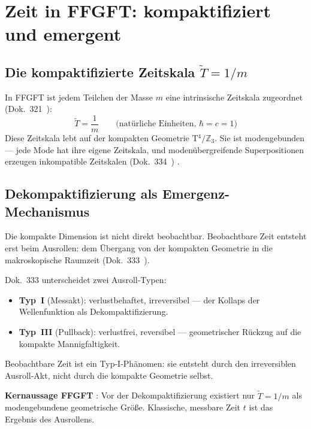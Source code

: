 \section{Zeit in FFGFT: kompaktifiziert und emergent}

\subsection{Die kompaktifizierte Zeitskala $\tilde{T} = 1/m$}

In FFGFT ist jedem Teilchen der Masse $m$ eine intrinsische
Zeitskala zugeordnet (Dok.~321~\cite{Pascher321}):
\begin{equation}
  \tilde{T} = \frac{1}{m}
  \qquad \text{(natürliche Einheiten, $\hbar = c = 1$)}
\end{equation}
Diese Zeitskala lebt auf der kompakten Geometrie T$^4/\mathbb{Z}_3$.
Sie ist modengebunden --- jede Mode hat ihre eigene Zeitskala,
und modenübergreifende Superpositionen erzeugen inkompatible
Zeitskalen (Dok.~334~\cite{Pascher334}) \BM.

\subsection{Dekompaktifizierung als Emergenz-Mechanismus}

Die kompakte Dimension ist nicht direkt beobachtbar.
Beobachtbare Zeit entsteht erst beim Ausrollen:
dem Übergang von der kompakten Geometrie in die makroskopische
Raumzeit (Dok.~333~\cite{Pascher333}).

Dok.~333 unterscheidet zwei Ausroll-Typen:
\begin{itemize}
  \item \textbf{Typ~I} (Messakt): verlustbehaftet, irreversibel ---
    der Kollaps der Wellenfunktion als Dekompaktifizierung.
  \item \textbf{Typ~III} (Pullback): verlustfrei, reversibel ---
    geometrischer Rückzug auf die kompakte Mannigfaltigkeit.
\end{itemize}
Beobachtbare Zeit ist ein Typ-I-Phänomen: sie entsteht durch
den irreversiblen Ausroll-Akt, nicht durch die kompakte Geometrie selbst.

\textbf{Kernaussage FFGFT} \BM:
Vor der Dekompaktifizierung existiert nur $\tilde{T} = 1/m$
als modengebundene geometrische Größe.
Klassische, messbare Zeit $t$ ist das Ergebnis des Ausrollens.

